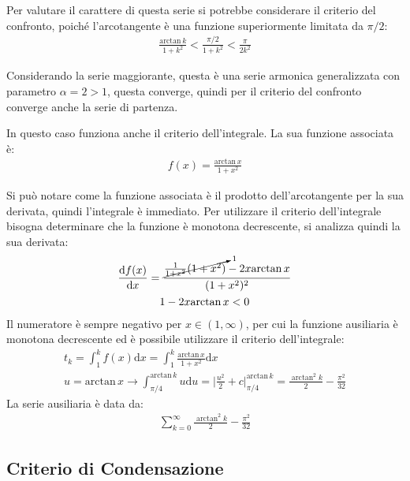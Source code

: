 \documentclass{article}
\numberwithin{equation}{subsection}
\begin{document}
Per valutare il carattere di questa serie si potrebbe considerare il criterio del confronto, poiché l'arcotangente è una funzione superiormente limitata da $\pi/2$:
\begin{gather*}
    \displaystyle\frac{\text{arctan}\,k}{1+k^2}<\frac{\pi/2}{1+k^2}<\frac{\pi}{2k^2}
\end{gather*}

Considerando la serie maggiorante, questa è una serie armonica generalizzata con parametro $\alpha=2>1$, questa converge, quindi per il criterio del confronto converge anche la serie di partenza. 

In questo caso funziona anche il criterio dell'integrale. La sua funzione associata è:
\begin{gather*}
    f(x)=\displaystyle\frac{\text{arctan}\, x}{1+x^2}
\end{gather*}

Si può notare come la funzione associata è il prodotto dell'arcotangente per la sua derivata, quindi l'integrale è immediato. Per utilizzare il criterio dell'integrale bisogna determinare che la funzione è monotona decrescente, si analizza quindi la sua derivata:
\begin{gather*}
    \displaystyle\frac{\mathrm{d}f(x)}{\mathrm{d}x}=\displaystyle\frac{\cancelto{1}{\frac{1}{1+x^2}(1+x^2)}-2x\text{arctan}\,x}{(1+x^2)^2}\\
    1-2x\text{arctan}\,x <0
\end{gather*}
Il numeratore è sempre negativo per $x\in(1,\infty)$, per cui la funzione ausiliaria è monotona decrescente ed è possibile utilizzare il criterio dell'integrale:
\begin{gather*}
    t_k=\displaystyle\int_{1}^kf(x)\mathrm{d}x=\int_1^k\frac{\text{arctan}\,x}{1+x^2}\mathrm{d}x\\
    u=\text{arctan}\,x\rightarrow\int_{\pi/4}^{\text{arctan}\,k}u \mathrm{d}u=\bigg|\frac{u^2}{2}+c\bigg|_{\pi/4}^{\text{arctan}\,k}=\frac{\arctan^2k}{2}-\frac{\pi^2}{32}
\end{gather*}
La serie ausiliaria è data da:
\begin{gather*}
    \sum_{k=0}^{\infty}\frac{\arctan^2k}{2}-\frac{\pi^2}{32}
\end{gather*}


\subsection{Criterio di Condensazione}
\end{document}
